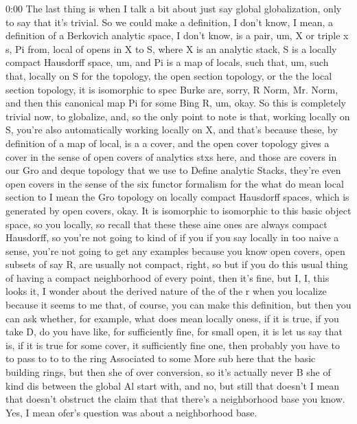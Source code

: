 \begin{unfinished}{0:00}
The last thing is when I talk a bit about just say global globalization, only to say that it's trivial. So we could make a definition, I don't know, I mean, a definition of a Berkovich analytic space, I don't know, is a pair, um, X or triple x s, Pi from, local of opens in X to S, where X is an analytic stack, S is a locally compact Hausdorff space, um, and Pi is a map of locals, such that, um, such that, locally on S for the topology, the open section topology, or the the local section topology, it is isomorphic to spec Burke are, sorry, R Norm, Mr. Norm, and then this canonical map Pi for some Bing R, um, okay. So this is completely trivial now, to globalize, and, so the only point to note is that, working locally on S, you're also automatically working locally on X, and that's because these, by definition of a map of local, is a a cover, and the open cover topology gives a cover in the sense of open covers of analytics stxs here, and those are covers in our Gro and deque topology that we use to Define analytic Stacks, they're even open covers in the sense of the six functor formalism for the what do mean local section to I mean the Gro topology on locally compact Hausdorff spaces, which is generated by open covers, okay. It is isomorphic to isomorphic to this basic object space, so you locally, so recall that these these aine ones are always compact Hausdorff, so you're not going to kind of if you if you say locally in too naive a sense, you're not going to get any examples because you know open covers, open subsets of say R, are usually not compact, right, so but if you do this usual thing of having a compact neighborhood of every point, then it's fine, but I, I, this looks it, I wonder about the derived nature of the of the r when you localize because it seems to me that, of course, you can make this definition, but then you can ask whether, for example, what does mean locally oness, if it is true, if you take D, do you have like, for sufficiently fine, for small open, it is let us say that is, if it is true for some cover, it sufficiently fine one, then probably you have to to pass to to to the ring Associated to some
More sub here that the basic building rings, but then she of over conversion, so it's actually never B she of kind dis between the global Al start with, and no, but still that doesn't I mean that doesn't obstruct the claim that that there's a neighborhood base you know. Yes, I mean ofer's question was about a neighborhood base.


\end{unfinished}
